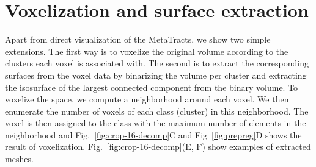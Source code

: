 \section {Voxelization and surface extraction}
\label{sec:vis}
Apart from direct visualization of the MetaTracts, we show two simple extensions. The first way is to voxelize the original volume according to the clusters each voxel is associated with.
The second is to extract the corresponding surfaces from the voxel data by binarizing the volume per cluster and extracting the isosurface of the largest connected component from the binary volume. To voxelize the space,  we compute a neighborhood around each voxel. We then enumerate the number of voxels of each class (cluster) in this neighborhood. The voxel is then assigned to the class with the maximum number of elements in the neighborhood and Fig.~\ref{fig:crop-16-decomp}C and Fig~\ref{fig:prepreg}D shows the result of voxelization. Fig.~\ref{fig:crop-16-decomp}(E, F) show examples of extracted meshes.
%
%
%
